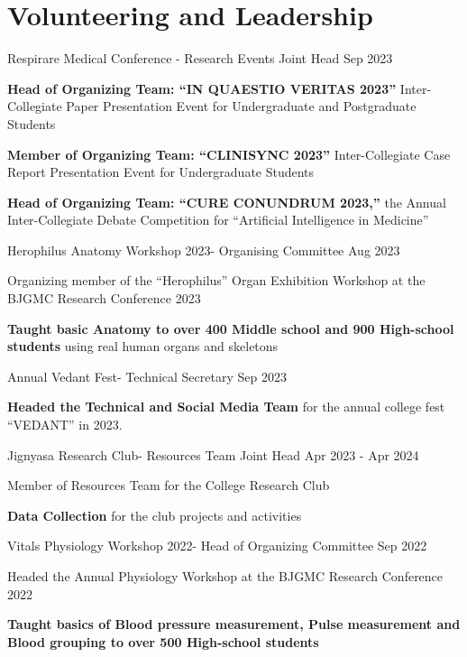 \section{Volunteering and Leadership}
\resumeSubHeadingListStart

\resumeProject
{Respirare Medical Conference - Research Events Joint Head}
{}
{Sep 2023} 

\resumeItemListStart
    \item[$\bullet$]{\textbf{Head of Organizing Team: “IN QUAESTIO VERITAS 2023”} Inter-Collegiate Paper Presentation Event for Undergraduate and Postgraduate Students}
	\item[$\bullet$]{\textbf{Member of Organizing Team: “CLINISYNC 2023”} Inter-Collegiate Case Report Presentation Event for Undergraduate Students}
	\item[$\bullet$]{\textbf{Head of Organizing Team: “CURE CONUNDRUM 2023,”} the Annual Inter-Collegiate Debate Competition for “Artificial Intelligence in Medicine”}
\resumeItemListEnd

\resumeProject
{Herophilus Anatomy Workshop 2023- Organising Committee}
{}
{Aug 2023} 

\resumeItemListStart
    \item[$\bullet$]{Organizing member of the “Herophilus” Organ Exhibition Workshop at the BJGMC Research Conference 2023}
	\item[$\bullet$]{\textbf{Taught basic Anatomy to over 400 Middle school and 900 High-school students} using real human organs and skeletons}
\resumeItemListEnd

\resumeProject
{Annual Vedant Fest- Technical Secretary}
{}
{Sep 2023} 

\resumeItemListStart
    \item[$\bullet$]{\textbf{Headed the Technical and Social Media Team} for the annual college fest “VEDANT”  in 2023.}
\resumeItemListEnd

\resumeProject
{Jignyasa Research Club- Resources Team Joint Head}
{}
{Apr 2023 - Apr 2024} 

\resumeItemListStart
    \item[$\bullet$]{Member of Resources Team for the College Research Club}
    \item[$\bullet$]{\textbf{Data Collection} for the club projects and activities} 
\resumeItemListEnd

\resumeProject
{Vitals Physiology Workshop 2022- Head of Organizing Committee}
{}
{Sep 2022} 

\resumeItemListStart
    \item[$\bullet$]{Headed the Annual Physiology Workshop at the BJGMC Research Conference 2022}
	\item[$\bullet$]{\textbf{Taught basics of Blood pressure measurement, Pulse measurement and Blood grouping to over 500 High-school students}}
\resumeItemListEnd

\resumeSubHeadingListEnd



